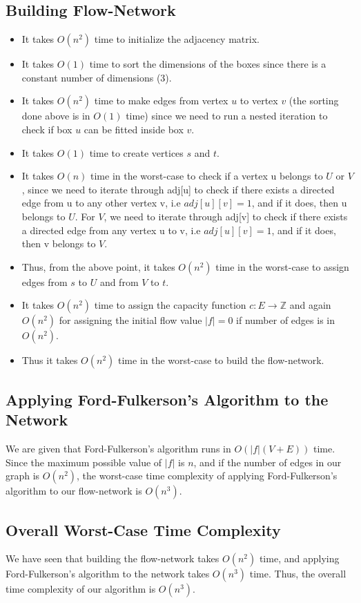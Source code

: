 \documentclass{article}
\begin{document}
\subsection{Building Flow-Network}
\begin{itemize}
    \item It takes $O(n^2)$ time to initialize the adjacency matrix.
    \item It takes $O(1)$ time to sort the dimensions of the boxes since there is a constant number of dimensions (3).
    \item It takes $O(n^2)$ time to make edges from vertex $u$ to vertex $v$ (the sorting done above is in $O(1)$ time) since we need to run a nested iteration to check if box $u$ can be fitted inside box $v$.
    \item It takes $O(1)$ time to create vertices $s$ and $t$.
    \item It takes $O(n)$ time in the worst-case to check if a vertex u belongs to $U$ or $V$, since we need to iterate through adj[u] to check if there exists a directed edge from u to any other vertex v, i.e $adj[u][v] = 1$, and if it does, then u belongs to $U$. For $V$, we need to iterate through adj[v] to check if there exists a directed edge from any vertex u to v, i.e $adj[u][v] = 1$, and if it does, then v belongs to $V$.
    \item Thus, from the above point, it takes $O(n^2)$ time in the worst-case to assign edges from $s$ to $U$ and from $V$ to $t$.
    \item It takes $O(n^2)$ time to assign the capacity function $c: E \rightarrow \mathbb{Z}$ and again $O(n^2)$ for assigning the initial flow value $|f| = 0$ if number of edges is in $O(n^2)$.
    \item Thus it takes $O(n^2)$ time in the worst-case to build the flow-network.
\end{itemize}

\subsection{Applying Ford-Fulkerson's Algorithm to the Network}
We are given that Ford-Fulkerson's algorithm runs in $O(|f|(V + E))$ time. Since the maximum possible value of $|f|$ is $n$, and if the number of edges in our graph is $O(n^2)$, the worst-case time complexity of applying Ford-Fulkerson's algorithm to our flow-network is $O(n^3)$.

\subsection{Overall Worst-Case Time Complexity}
We have seen that building the flow-network takes $O(n^2)$ time, and applying Ford-Fulkerson's algorithm to the network takes $O(n^3)$ time. Thus, the overall time complexity of our algorithm is $O(n^3)$.
\end{document}
